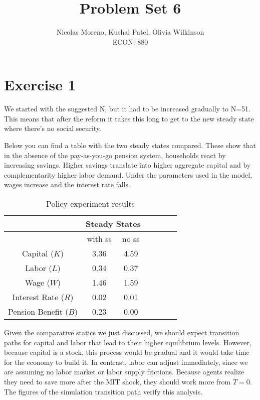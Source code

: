 \documentclass[12pt]{article}
\begin{document}
 
\title{Problem Set 6}
\author{Nicolas Moreno, Kushal Patel, Olivia Wilkinson \\
ECON: 880}
\maketitle

\section{Exercise 1}
We started with the suggested N, but it had to be increased gradually to N=51. This means that after the reform it takes this long to get to the new steady state where there's no social security.

Below you can find a table with the two steady states compared. These show that in the absence of the pay-as-you-go pension system, households react by increasing savings. Higher savings translate into higher aggregate capital and by complementarity higher labor demand. Under the parameters used in the model, wages increase and the interest rate falls.

\begin{table}[h!]
    \centering
    \caption{Policy experiment results }
    \begin{tabular}{|c|c|c|c|c|c|c|}
    \hline
         & \multicolumn{2}{c|}{Steady States} \\
         \hline 
         & with ss & no ss \\
         \hline
         Capital ($K$) & 3.36 & 4.59  \\
         Labor ($L$) & 0.34 & 0.37 \\
         Wage ($W$)  & 1.46 & 1.59  \\
         Interest Rate ($R$) & 0.02 & 0.01\\
         Pension Benefit ($B$) & 0.23 & 0.00 \\
         \hline 
    \end{tabular}
    \label{tab:policyres}
\end{table}

Given the comparative statics we just discussed, we should expect transition paths for capital and labor that lead to their higher equilibrium levels. However, because capital is a stock, this process would be gradual and it would take time for the economy to build it. In contrast, labor can adjust immediately, since we are assuming no labor market or labor supply frictions. Because agents realize they need to save more after the MIT shock, they should work more from $T=0$. The figures of the simulation transition path verify this analysis.\\
\end{document}
